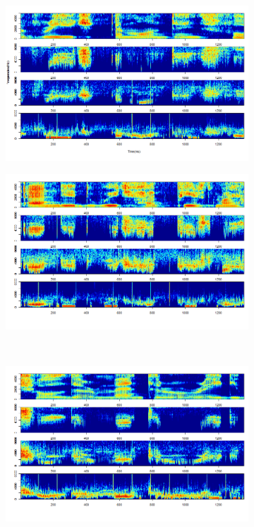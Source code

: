 \documentclass[11pt, a4paper]{article} %
\begin{document}
\begin{landscape}

\begin{figure}
\begin{subfigure}{0.8\textwidth}
  \centering
  \includegraphics[width=\linewidth]{spectro_speak1.png}
  \label{fig:sfig1}
\end{subfigure}%
\begin{subfigure}{0.8\textwidth}
  \centering
  \includegraphics[width=\linewidth]{spectro_speak1_bis.png}
  \label{fig:sfig2}
\end{subfigure}\\
\begin{subfigure}{0.8\textwidth}
  \centering
  \includegraphics[width=\linewidth]{spectro_speak1_tris.png}

\end{subfigure}
\end{figure}
\end{landscape}
\end{document}
